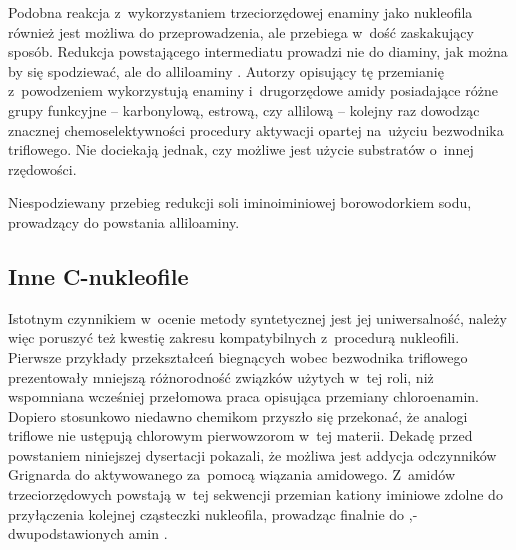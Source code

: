 Podobna reakcja z~wykorzystaniem trzeciorzędowej enaminy  jako nukleofila również jest możliwa do przeprowadzenia,
  ale przebiega w~dość zaskakujący sposób.
Redukcja powstającego intermediatu  prowadzi nie do diaminy,
  jak można by się spodziewać, ale do alliloaminy .
Autorzy opisujący tę przemianię z~powodzeniem wykorzystują enaminy i~drugorzędowe amidy posiadające różne grupy funkcyjne \---
  karbonylową, estrową, czy allilową \--- kolejny raz dowodząc znacznej chemoselektywności procedury aktywacji opartej na~użyciu bezwodnika triflowego.
Nie dociekają jednak, czy możliwe jest użycie substratów o~innej rzędowości.
\begin{scheme*}
  \centering
  
  \caption{
    Niespodziewany przebieg redukcji soli iminoiminiowej  borowodorkiem sodu,
    prowadzący do powstania alliloaminy.
  }
  \label{sch:allyloamine-synthesis}
\end{scheme*}

\subsection{Inne C-nukleofile}\label{literature:triflic:c-nucleophiles}
Istotnym czynnikiem w~ocenie metody syntetycznej jest jej uniwersalność, należy więc poruszyć też
  kwestię zakresu kompatybilnych z~procedurą nukleofili.
Pierwsze przykłady przekształceń biegnących wobec bezwodnika triflowego prezentowały mniejszą
  różnorodność związków użytych w~tej roli, niż wspomniana wcześniej przełomowa
  praca opisująca przemiany chloroenamin.
Dopiero stosunkowo niedawno chemikom przyszło się przekonać, że analogi triflowe nie ustępują
  chlorowym pierwowzorom w~tej materii.
Dekadę przed powstaniem niniejszej dysertacji \citeauthor{xiao10} pokazali,
  że możliwa jest addycja odczynników Grignarda do aktywowanego za~pomocą  wiązania amidowego.
Z~amidów trzeciorzędowych  powstają w~tej sekwencji przemian kationy iminiowe
   zdolne do przyłączenia kolejnej cząsteczki nukleofila,
  prowadząc finalnie do \textalpha,\textalpha-dwupodstawionych amin .

